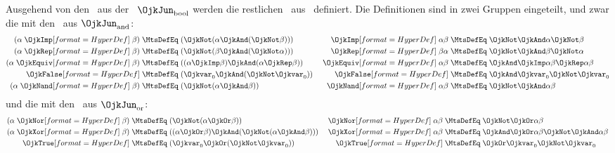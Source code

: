 Ausgehend von den \Junktoren\ aus der \BooleschenSignatur\ $\OjkJun_{\RawMtsIdxBool}$ werden die restlichen \Junktoren\ aus \OjkJun\ definiert.
Die Definitionen sind in zwei Gruppen eingeteilt, und zwar die mit den \Junktoren\ aus $\OjkJun_{\RawMtsIdxAnd}$:
\begin{align}
(\alpha \defSymBin{\OjkImp}   \beta) &\;\MtsDefEq\; (\OjkNot (\alpha \OjkAnd  (\OjkNot \beta))) &
\defSymBin{\OjkImp}  \alpha   \beta  &\;\MtsDefEq\;  \OjkNot    \OjkAnd \alpha \OjkNot \beta
\label{def:imp}
\\
(\alpha \defSymBin{\OjkRep}   \beta) &\;\MtsDefEq\; (\OjkNot (\beta \OjkAnd  (\OjkNot \alpha))) &
\defSymBin{\OjkRep}   \beta  \alpha  &\;\MtsDefEq\;  \OjkNot    \OjkAnd \beta \OjkNot \alpha
\label{def:rep}
\\
(\alpha \defSymBin{\OjkEquiv} \beta) &\;\MtsDefEq\; ((\alpha \OjkImp \beta) \OjkAnd (\alpha \OjkRep \beta)) &
\defSymBin{\OjkEquiv} \alpha  \beta  &\;\MtsDefEq\; \OjkAnd \OjkImp \alpha \beta \OjkRep \alpha \beta
\label{def:equiv}
\\
\defSym{\OjkFalse}                   &\;\MtsDefEq\; (\Ojkvar_0 \OjkAnd (\OjkNot \Ojkvar_0)) &
\defSym{\OjkFalse}                   &\;\MtsDefEq\;  \OjkAnd \Ojkvar_0  \OjkNot \Ojkvar_0   \label{def:false}
\\
(\alpha \defSymBin{\OjkNand}  \beta) &\;\MtsDefEq\; (\OjkNot (\alpha \OjkAnd \beta )) &
\defSymBin{\OjkNand}  \alpha  \beta  &\;\MtsDefEq\;  \OjkNot  \OjkAnd \alpha \beta \label{def:nand}
\end{align}
und die mit den \Junktoren\ aus $\OjkJun_{\RawMtsIdxOr}$:
\begin{align}
(\alpha \defSymBin{\OjkNor}   \beta) & \;\MtsDefEq\; (\OjkNot (\alpha \OjkOr \beta))   &
\defSymBin{\OjkNor}   \alpha  \beta  & \;\MtsDefEq\;  \OjkNot  \OjkOr \alpha \beta \label{def:nor}
\\
(\alpha \defSymBin{\OjkXor}   \beta) & \;\MtsDefEq\; ((\alpha \OjkOr \beta) \OjkAnd (\OjkNot (\alpha \OjkAnd \beta)))&
\defSymBin{\OjkXor}   \alpha  \beta  & \;\MtsDefEq\;  \OjkAnd \OjkOr\alpha\beta \OjkNot \OjkAnd \alpha \beta
\label{def:add}
\\
\defSym{\OjkTrue} & \;\MtsDefEq\; (\Ojkvar_0 \OjkOr (\OjkNot \Ojkvar_0)) &
\defSym{\OjkTrue} & \;\MtsDefEq\;  \OjkOr \Ojkvar_0  \OjkNot \Ojkvar_0
\label{def:true}
\end{align}

